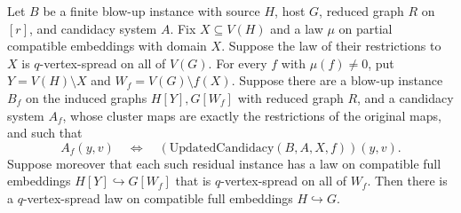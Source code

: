 \begin{lemma}
Let $B$ be a finite blow-up instance with source $H$, host $G$, reduced graph
$R$ on $[r]$, and candidacy system $A$. Fix $X\subseteq V(H)$ and a law
$\mu$ on partial compatible embeddings with domain $X$. Suppose the law of
their restrictions to $X$ is $q$-vertex-spread on all of $V(G)$.
For every $f$ with $\mu(f)\ne0$, put
$Y=V(H)\setminus X$ and $W_f=V(G)\setminus f(X)$. Suppose there are a
blow-up instance $B_f$ on the induced graphs $H[Y],G[W_f]$ with reduced
graph $R$, and a candidacy system $A_f$, whose cluster maps are exactly the
restrictions of the original maps, and such that
\[
 A_f(y,v)\quad\Longleftrightarrow\quad
 (\mathrm{UpdatedCandidacy}(B,A,X,f))(y,v).
\]
Suppose moreover that each such residual instance has a law on compatible
full embeddings $H[Y]\hookrightarrow G[W_f]$ that is $q$-vertex-spread
on all of $W_f$. Then there is a $q$-vertex-spread law on compatible full
embeddings $H\hookrightarrow G$.
\end{lemma}
